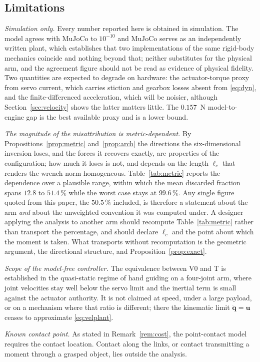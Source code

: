 \documentclass{ieeeaccess}
\newcommand{\lc}{\ell_c}
\begin{document}
\subsection{Limitations}
\emph{Simulation only.} Every number reported here is obtained in simulation. The
model agrees with MuJoCo to $10^{-10}$ and MuJoCo serves as an independently
written plant, which establishes that two implementations of the same rigid-body
mechanics coincide and nothing beyond that; neither substitutes for the physical
arm, and the agreement figure should not be read as evidence of physical
fidelity. Two quantities are expected
to degrade on hardware: the actuator-torque proxy from servo current, which
carries stiction and gearbox losses absent from \eqref{eq:dyn}, and the
finite-differenced acceleration, which will be noisier, although
Section~\ref{sec:velocity} shows the latter matters little. The $0.157$~N
model-to-engine gap is the best available proxy and is a lower bound.

\emph{The magnitude of the misattribution is metric-dependent.} By
Propositions~\ref{prop:metric} and~\ref{prop:arch} the directions the
six-dimensional inversion loses, and the forces it recovers exactly, are
properties of the configuration; how much it loses is not, and depends on the length $\lc$ that renders the wrench norm
homogeneous. Table~\ref{tab:metric} reports the dependence over a plausible range,
within which the mean discarded fraction spans $12.8$ to $51.4\,\%$ while the
worst case stays at $99.6\,\%$. Any single figure quoted from this paper, the
$50.5\,\%$ included, is therefore a statement about the arm \emph{and} about the
unweighted convention it was computed under. A designer applying the analysis to
another arm should recompute Table~\ref{tab:metric} rather than transport the
percentage, and should declare $\lc$ and the point about which the moment is
taken. What transports without recomputation is the geometric argument, the
directional structure, and Proposition~\ref{prop:exact}.

\emph{Scope of the model-free controller.} The equivalence between V0 and T is
established in the quasi-static regime of hand guiding on a four-joint arm, where
joint velocities stay well below the servo limit and the inertial term is small
against the actuator authority. It is not claimed at speed, under a large
payload, or on a mechanism where that ratio is different; there the kinematic
limit $\dot{\bm q}=\bm u$ ceases to approximate \eqref{eq:velplant}.

\emph{Known contact point.} As stated in Remark~\ref{rem:cost}, the point-contact
model requires the contact location. Contact along the links, or contact
transmitting a moment through a grasped object, lies outside the analysis.
\end{document}
